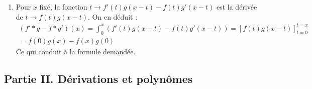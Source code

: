 \begin{enumerate}
\begin{enumerate}
 \item Pour $x$ fixé, la fonction $t\rightarrow f'(t)g(x-t)-f(t)g'(x-t)$ est la dérivée de $t\rightarrow f(t)g(x-t)$. On en déduit :
\begin{multline*}
 (f'*g-f*g')(x)=\int_0^x\left(f'(t)g(x-t)-f(t)g'(x-t)\right)
=\left[f(t)g(x-t)\right]_{t=0}^{t=x}\\=f(0)g(x)-f(x)g(0)  
\end{multline*}
Ce qui conduit à la formule demandée.
\end{enumerate}

\end{enumerate}

\subsection*{Partie II. Dérivations et polynômes}

